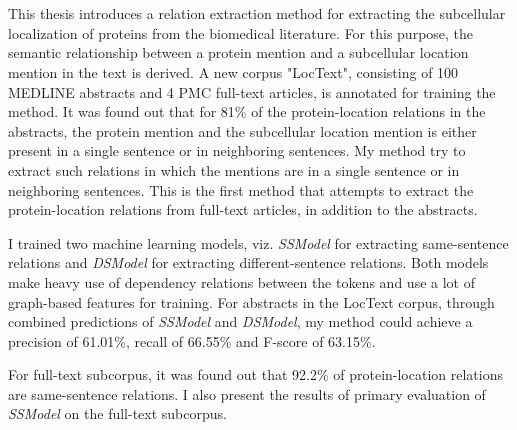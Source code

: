 \chapter{\abstractname}



This thesis introduces a relation extraction method for extracting the subcellular localization of proteins from the biomedical literature. For this purpose, the semantic relationship between a protein mention and a subcellular location mention in the text is derived. A new corpus "LocText", consisting of 100 MEDLINE abstracts and 4 PMC full-text articles, is annotated for training the method. It was found out that for 81\% of the protein-location relations in the abstracts, the protein mention and the subcellular location mention is either present in a single sentence or in neighboring sentences. My method try to extract such relations in which the mentions are in a single sentence or in neighboring sentences. This is the first method that attempts to extract the protein-location relations from full-text articles, in addition to the abstracts.

I trained two machine learning models, viz. \textit{SSModel} for extracting same-sentence relations and \textit{DSModel} for extracting different-sentence relations. Both models make heavy use of dependency relations between the tokens and use a lot of graph-based features for training. For abstracts in the LocText corpus, through combined predictions of \textit{SSModel} and \textit{DSModel}, my method could achieve a precision of 61.01\%, recall of 66.55\% and F-score of 63.15\%.

For full-text subcorpus, it was found out that 92.2\% of protein-location relations are same-sentence relations. I also present the results of primary evaluation of \textit{SSModel} on the full-text subcorpus.